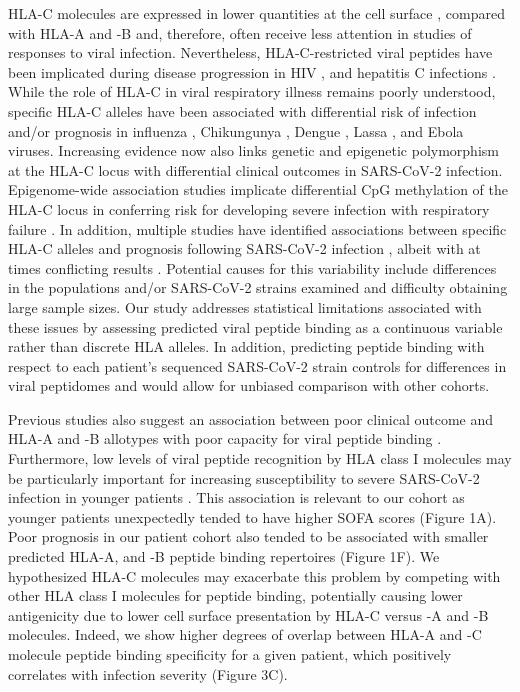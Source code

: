 \documentclass[utf8]{frontiersinFPHY_FAMS} %
\begin{document}
HLA-C molecules are expressed in lower quantities at the cell surface \citep{332508, 1383381, 332508, 2967765, 7760000}, compared with HLA-A and -B and, therefore, often receive less attention in studies of responses to viral infection.   Nevertheless, HLA-C-restricted viral peptides have been implicated during disease progression in HIV \citep{21814282, 22807681, 26575988, 24785948, 27880898, 32501836}, and hepatitis C infections \citep{27057987}. While the role of HLA-C in viral respiratory illness remains poorly understood, specific  HLA-C alleles have been associated with differential risk of infection and/or prognosis in influenza \citep{18246204, 22216211, 31191533}, Chikungunya \citep{21966274}, Dengue \citep{25264760}, Lassa \citep{30711514}, and Ebola \citep{20878400, 33350932, 28558022} viruses. Increasing evidence now also links genetic and epigenetic polymorphism at the HLA-C locus with differential clinical outcomes in SARS-CoV-2 infection. Epigenome-wide association studies implicate differential CpG methylation of the HLA-C locus in conferring risk for developing severe infection with respiratory failure \citep{33867313}. In addition, multiple studies have identified associations between specific HLA-C alleles and prognosis following SARS-CoV-2 infection \citep{34352002, 35874712, 33233780, 34352002, 35874712, 33233780, 37468623, 37112884, 36627290},  albeit with at times conflicting results \cite{36534127, 38251811}. Potential causes for this variability include differences in the populations and/or SARS-CoV-2 strains examined and difficulty obtaining large sample sizes. Our study addresses statistical limitations associated with these issues by assessing predicted viral peptide binding as a continuous variable rather than discrete HLA alleles. In addition, predicting peptide binding with respect to each patient's sequenced SARS-CoV-2 strain controls for differences in viral peptidomes and would allow for unbiased comparison with other cohorts.       

Previous studies also suggest an association between poor clinical outcome and HLA-A and -B allotypes with poor capacity for viral peptide binding \citep{33968060, 33298875}. Furthermore, low levels of viral peptide recognition by HLA class I molecules may be particularly important for increasing susceptibility to severe SARS-CoV-2 infection in younger patients \citep{35911710}. This association is relevant to our cohort as younger patients unexpectedly tended to have higher SOFA scores (Figure 1A). Poor prognosis in our patient cohort also tended to be associated with smaller predicted HLA-A, and -B peptide binding repertoires (Figure 1F). We hypothesized HLA-C molecules may exacerbate this problem by competing with other HLA class I molecules for peptide binding, potentially causing lower antigenicity due to lower cell surface presentation by HLA-C versus -A and -B molecules. Indeed, we show higher degrees of overlap between HLA-A and -C molecule peptide binding specificity for a given patient, which positively correlates with infection severity (Figure 3C). 
\end{document}
